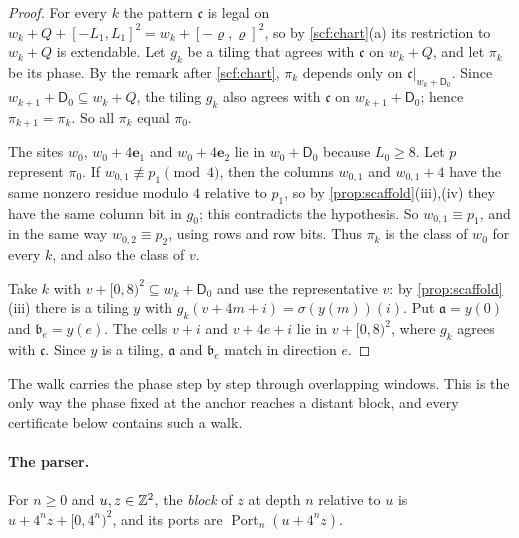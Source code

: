 \begin{proof}
For every $k$ the pattern $\mathfrak c$ is legal on $w_k+Q+[-L_1,L_1]^2=w_k+[-\varrho,\varrho]^2$, so by \cref{scf:chart}(a) its restriction to $w_k+Q$ is extendable. Let $g_k$ be a tiling that agrees with $\mathfrak c$ on $w_k+Q$, and let $\pi_k$ be its phase. By the remark after \cref{scf:chart}, $\pi_k$ depends only on $\mathfrak c|_{w_k+\mathsf D_0}$. Since $w_{k+1}+\mathsf D_0\subseteq w_k+Q$, the tiling $g_k$ also agrees with $\mathfrak c$ on $w_{k+1}+\mathsf D_0$; hence $\pi_{k+1}=\pi_k$. So all $\pi_k$ equal $\pi_0$.

The sites $w_0$, $w_0+4\mathbf e_1$ and $w_0+4\mathbf e_2$ lie in $w_0+\mathsf D_0$ because $L_0\ge8$. Let $p$ represent $\pi_0$. If $w_{0,1}\not\equiv p_1\pmod4$, then the columns $w_{0,1}$ and $w_{0,1}+4$ have the same nonzero residue modulo $4$ relative to $p_1$, so by \cref{prop:scaffold}(iii),(iv) they have the same column bit in $g_0$; this contradicts the hypothesis. So $w_{0,1}\equiv p_1$, and in the same way $w_{0,2}\equiv p_2$, using rows and row bits. Thus $\pi_k$ is the class of $w_0$ for every $k$, and also the class of $v$.

Take $k$ with $v+[0,8)^2\subseteq w_k+\mathsf D_0$ and use the representative $v$: by \cref{prop:scaffold}(iii) there is a tiling $y$ with $g_k(v+4m+i)=\sigma(y(m))(i)$. Put $\mathfrak a=y(0)$ and $\mathfrak b_e=y(e)$. The cells $v+i$ and $v+4e+i$ lie in $v+[0,8)^2$, where $g_k$ agrees with $\mathfrak c$. Since $y$ is a tiling, $\mathfrak a$ and $\mathfrak b_e$ match in direction $e$.
\end{proof}

The walk carries the phase step by step through overlapping windows. This is the only way the phase fixed at the anchor reaches a distant block, and every certificate below contains such a walk.

\paragraph{The parser.} For $n\ge0$ and $u,z\in\mathbb{Z}^2$, the \emph{block} of $z$ at depth $n$ relative to $u$ is $u+4^nz+[0,4^n)^2$, and its ports are $\operatorname{Port}_n(u+4^nz)$.

